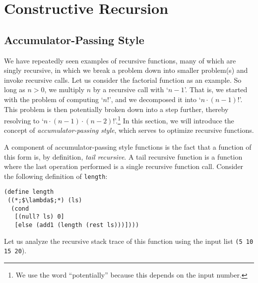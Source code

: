 \section{Constructive Recursion}
\subsection*{Accumulator-Passing Style}
We have repeatedly seen examples of recursive functions, many of which are singly recursive, in which we break a problem down into smaller problem(s) and invoke recursive calls. Let us consider the factorial function as an example. So long as $n>0$, we multiply $n$ by a recursive call with `$n-1$'. That is, we started with the problem of computing `$n!$', and we decomposed it into `$n\cdot{(n-1)!}$'. This problem is then potentially broken down into a step further, thereby resolving to `$n\cdot{(n-1)}\cdot{(n-2)!}$'.\footnote{We use the word ``potentially'' because this depends on the input number.} In this section, we will introduce the concept of \textit{accumulator-passing style}, which serves to optimize recursive functions.

A component of accumulator-passing style functions is the fact that a function of this form is, by definition, \textit{tail recursive}. A tail recursive function is a function where the last operation performed is a single recursive function call. Consider the following definition of \texttt{length}:
\begin{cl}[]{}\begin{lstlisting}[language=MyScheme]
(define length
 ((*;$\lambda$;*) (ls)
  (cond
   [(null? ls) 0]
   [else (add1 (length (rest ls)))])))
\end{lstlisting}\end{cl}
Let us analyze the recursive stack trace of this function using the input list \texttt{\q(5 10 15 20}).

